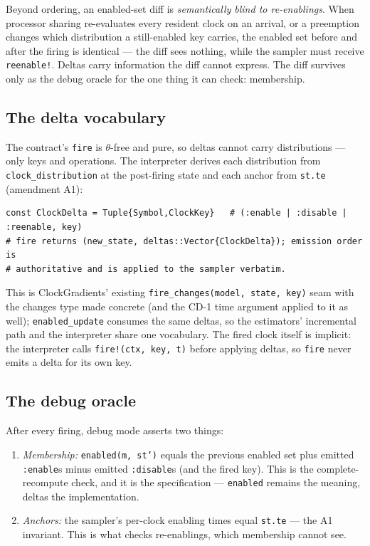 \documentclass[11pt]{article}
\newcommand{\code}[1]{\texttt{#1}}
\begin{document}
Beyond ordering, an enabled-set diff is \emph{semantically blind to
re-enablings}. When processor sharing re-evaluates every resident clock on an
arrival, or a preemption changes which distribution a still-enabled key
carries, the enabled set before and after the firing is identical --- the
diff sees nothing, while the sampler must receive \code{reenable!}. Deltas
carry information the diff cannot express. The diff survives only as the
debug oracle for the one thing it can check: membership.

\subsection{The delta vocabulary}

The contract's \code{fire} is $\theta$-free and pure, so deltas cannot carry
distributions --- only keys and operations. The interpreter derives each
distribution from \code{clock\_distribution} at the post-firing state and
each anchor from \code{st.te} (amendment A1):

\begin{lstlisting}
const ClockDelta = Tuple{Symbol,ClockKey}   # (:enable | :disable | :reenable, key)
# fire returns (new_state, deltas::Vector{ClockDelta}); emission order is
# authoritative and is applied to the sampler verbatim.
\end{lstlisting}

This is ClockGradients' existing \code{fire\_changes(model, state, key)}
seam with the changes type made concrete (and the CD-1 time argument
applied to it as well); \code{enabled\_update} consumes the same deltas, so
the estimators' incremental path and the interpreter share one vocabulary.
The fired clock itself is implicit: the interpreter calls
\code{fire!(ctx, key, t)} before applying deltas, so \code{fire} never emits
a delta for its own key.

\subsection{The debug oracle}

After every firing, debug mode asserts two things:

\begin{enumerate}
\item \emph{Membership:} \code{enabled(m, st')} equals the previous enabled
  set plus emitted \code{:enable}s minus emitted \code{:disable}s (and the
  fired key). This is the complete-recompute check, and it is the
  specification --- \code{enabled} remains the meaning, deltas the
  implementation.
\item \emph{Anchors:} the sampler's per-clock enabling times equal
  \code{st.te} --- the A1 invariant. This is what checks re-enablings, which
  membership cannot see.
\end{enumerate}
\end{document}
